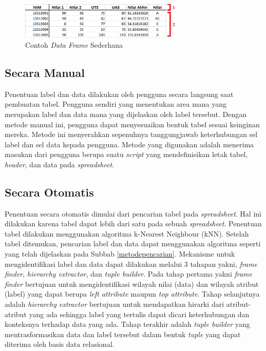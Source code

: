 \begin{figure}[htb]
    \centering
    \includegraphics[width=0.7\textwidth]{resources/chapter-3-simple-dataframe2.png}
    \caption{Contoh \textit{Data Frame} Sederhana}
	\label{DataFrameSederhana}
\end{figure}

	\subsection{Secara Manual}
	Penentuan label dan data dilakukan oleh pengguna secara langsung saat pembuatan tabel. Pengguna sendiri yang menentukan area mana yang merupakan label dan data mana yang dijelaskan oleh label tersebut. Dengan metode manual ini, pengguna dapat menyesuaikan bentuk tabel sesuai keinginan mereka. Metode ini menyerahkan sepenuhnya tanggungjawab keterhubungan sel label dan sel data kepada pengguna. Metode yang digunakan adalah menerima masukan dari pengguna berupa suatu \textit{script} yang mendefinisikan letak tabel, \textit{header}, dan data pada \textit{spreadsheet}.

	\subsection{Secara Otomatis}
	Penentuan secara otomatis dimulai dari pencarian tabel pada \textit{spreadsheet}. Hal ini dilakukan karena tabel dapat lebih dari satu pada sebuah \textit{spreadsheet}. Penentuan tabel dilakukan menggunakan algoritma k-Nearest Neighbour (kNN). Setelah tabel ditemukan, pencarian label dan data dapat menggunakan algoritma seperti yang telah dijelaskan pada Subbab \ref{metodepencarian}. Mekanisme untuk mengidentifikasi label dan data dapat dilakukan melalui 3 tahapan yakni, \textit{frame finder}, \textit{hierarchy extractor}, dan \textit{tuple builder}. Pada tahap pertama yakni \textit{frame finder} bertujuan untuk mengidentifikasi wilayah nilai (data) dan wilayah atribut (label) yang dapat berupa \textit{left attribute} maupun \textit{top attribute}. Tahap selanjutnya adalah \textit{hierarchy extractor} bertujuan untuk mendapatkan hirarki dari atribut-atribut yang ada sehingga label yang tertulis dapat dicari keterhubungan dan konteksnya terhadap data yang ada. Tahap terakhir adalah \textit{tuple builder} yang mentrasformasikan data dan label tersebut dalam bentuk \textit{tuple} yang dapat diterima oleh basis data relasional.

